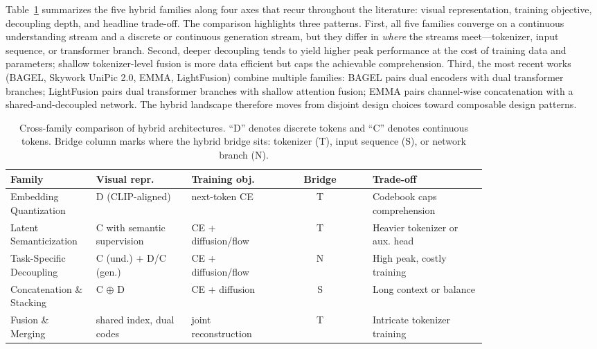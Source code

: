 Table~\ref{tab:hybrid-compare} summarizes the five hybrid families along four axes that recur throughout the literature: visual representation, training objective, decoupling depth, and headline trade-off. The comparison highlights three patterns. First, all five families converge on a continuous understanding stream and a discrete or continuous generation stream, but they differ in \emph{where} the streams meet---tokenizer, input sequence, or transformer branch. Second, deeper decoupling tends to yield higher peak performance at the cost of training data and parameters; shallow tokenizer-level fusion is more data efficient but caps the achievable comprehension. Third, the most recent works (BAGEL, Skywork UniPic 2.0, EMMA, LightFusion) combine multiple families: BAGEL pairs dual encoders with dual transformer branches; LightFusion pairs dual transformer branches with shallow attention fusion; EMMA pairs channel-wise concatenation with a shared-and-decoupled network. The hybrid landscape therefore moves from disjoint design choices toward composable design patterns.

\begin{table}[t]
  \caption{Cross-family comparison of hybrid architectures. ``D'' denotes discrete tokens and ``C'' denotes continuous tokens. Bridge column marks where the hybrid bridge sits: tokenizer (T), input sequence (S), or network branch (N).}
  \label{tab:hybrid-compare}
  \small
  \setlength{\tabcolsep}{4pt}
  \begin{tabular}{@{}p{0.18\linewidth}p{0.20\linewidth}p{0.18\linewidth}cp{0.24\linewidth}@{}}
    \toprule
    Family & Visual repr. & Training obj. & Bridge & Trade-off \\
    \midrule
    Embedding Quantization     & D (CLIP-aligned)            & next-token CE         & T & Codebook caps comprehension \\
    Latent Semanticization     & C with semantic supervision & CE + diffusion/flow   & T & Heavier tokenizer or aux. head \\
    Task-Specific Decoupling   & C (und.) + D/C (gen.)       & CE + diffusion/flow   & N & High peak, costly training \\
    Concatenation \& Stacking  & C $\oplus$ D                & CE + diffusion        & S & Long context or balance \\
    Fusion \& Merging          & shared index, dual codes    & joint reconstruction  & T & Intricate tokenizer training \\
    \bottomrule
  \end{tabular}
\end{table}


